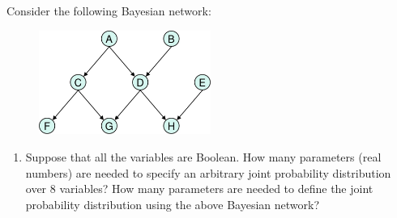 \documentclass[12pt]{article}
\newenvironment{problem}[2][Problem]{\begin{trivlist}
\item[\hskip \labelsep {\bfseries #1}\hskip \labelsep {\bfseries #2.}]}{\end{trivlist}}
\begin{document}
\begin{problem}{3}
	Consider the following Bayesian network:
	\begin{figure}[h]
		\centering
		\includegraphics[width=0.5\textwidth]{fig/q3.jpg}
		\label{fig:q3}
	\end{figure}
	 \begin{enumerate}
		 \item Suppose that all the variables are Boolean.
			 How many parameters (real numbers) are needed to specify an arbitrary joint probability distribution over 8 variables?
			 How many parameters are needed to define the joint probability distribution using the above Bayesian network?


\end{enumerate}
\end{problem}
\end{document}

